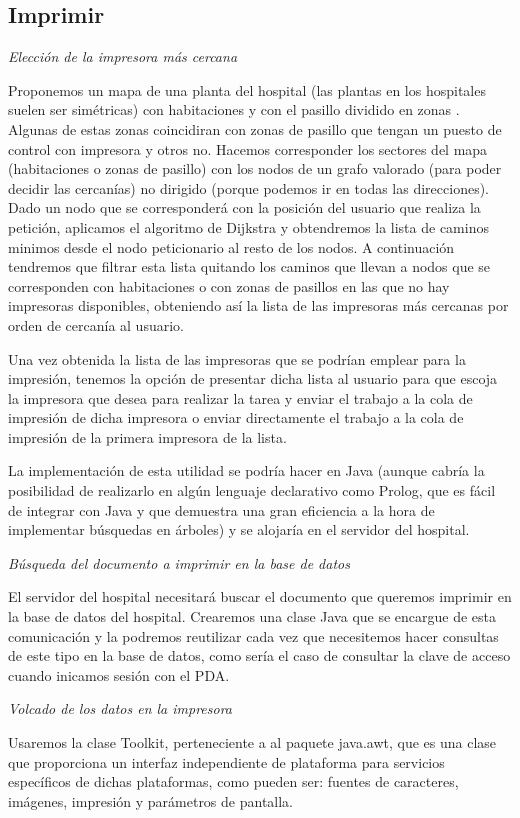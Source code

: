 \documentclass[12pt,a4paper,notitlepage,twoside]{report}
\begin{document}
\subsection{Imprimir}
\emph{Elecci\'on de la impresora m\'as cercana}
\begin{description}
Proponemos un mapa de una planta del hospital (las plantas en los hospitales suelen ser sim\'etricas) con habitaciones y con el pasillo dividido en zonas . Algunas de estas zonas coincidiran con zonas de pasillo que tengan un puesto de control con impresora y otros no. Hacemos corresponder los sectores del mapa (habitaciones  o zonas de pasillo) con los nodos de un grafo valorado (para poder decidir las cercan\'ias) no dirigido (porque podemos ir en todas las direcciones). Dado un nodo que se corresponder\'a con la posici\'on del usuario que realiza la petici\'on, aplicamos el algoritmo de Dijkstra y obtendremos la lista de caminos minimos desde el nodo peticionario al resto de los nodos. A continuaci\'on tendremos que filtrar esta lista quitando los caminos que llevan a nodos que se corresponden con habitaciones o con zonas de pasillos en las que no hay impresoras disponibles, obteniendo as\'i la lista de las impresoras m\'as cercanas por orden de cercan\'ia al usuario.
\end{description}
\begin{description}
Una vez obtenida la lista de las impresoras que se podrían emplear para la impresi\'on, tenemos la opci\'on de presentar dicha lista al usuario para que escoja la impresora que desea para realizar la tarea y enviar el trabajo a la cola de impresi\'on de dicha impresora o enviar directamente el trabajo a la cola de impresi\'on de la primera impresora de la lista.
\end{description}
\begin{description}
La implementaci\'on de esta utilidad se podr\'ia hacer en Java (aunque cabr\'ia la posibilidad de realizarlo en alg\'un lenguaje declarativo como Prolog, que es f\'acil de integrar con Java y que demuestra una gran eficiencia a la hora de implementar b\'usquedas en \'arboles) y se alojar\'ia en el servidor del hospital.
\end{description}
\emph{B\'usqueda del documento a imprimir en la base de datos}
\begin{description}
El servidor del hospital necesitar\'a buscar el documento que queremos imprimir en la base de datos del hospital. Crearemos una clase Java que se encargue de esta comunicaci\'on y la podremos  reutilizar cada vez que necesitemos hacer consultas de este tipo en la base de datos, como ser\'ia el caso de consultar la clave de acceso cuando inicamos sesi\'on con el PDA.
\end{description}
\emph{Volcado de los datos en la impresora}
\begin{description}
Usaremos la clase Toolkit, perteneciente a al paquete java.awt, que es una clase que proporciona un interfaz independiente de plataforma para servicios espec\'ificos de dichas plataformas, como pueden ser: fuentes de caracteres, im\'agenes, impresi\'on y par\'ametros de pantalla.
\end{description}
\end{document}
